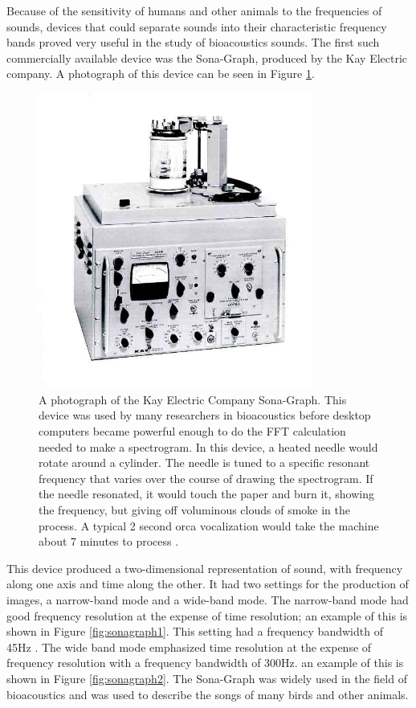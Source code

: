 Because of the sensitivity of humans and other animals to the
frequencies of sounds, devices that could separate sounds into their
characteristic frequency bands proved very useful in the study of
bioacoustics sounds.  The first such commercially available device was
the Sona-Graph, produced by the Kay Electric company.  A photograph of
this device can be seen in Figure \ref{fig:kayElectricSonagram}.

\begin{figure}[t]
\centering
\includegraphics[width=90mm]{figures/kayElectricSonagram}
\caption{A photograph of the Kay Electric Company Sona-Graph.  This
  device was used by many researchers in bioacoustics before desktop
  computers became powerful enough to do the FFT calculation needed to
  make a spectrogram.  In this device, a heated needle would rotate
  around a cylinder.  The needle is tuned to a specific resonant
  frequency that varies over the course of drawing the spectrogram.
  If the needle resonated, it would touch the paper and burn it,
  showing the frequency, but giving off voluminous clouds of smoke in
  the process.  A typical 2 second orca vocalization would take the
  machine about 7 minutes to process \cite{lindblom1962accuracy}. }
\label{fig:kayElectricSonagram}
\end{figure}


This device produced a two-dimensional representation of sound, with
frequency along one axis and time along the other.  It had two
settings for the production of images, a narrow-band mode and a
wide-band mode.  The narrow-band mode had good frequency resolution at
the expense of time resolution; an example of this is shown in Figure
\ref{fig:sonagraph1}.  This setting had a frequency bandwidth of 45Hz
\cite{nowicki1988birds}.  The wide band mode emphasized time
resolution at the expense of frequency resolution with a frequency
bandwidth of 300Hz. an example of this is shown in Figure
\ref{fig:sonagraph2}.  The Sona-Graph was widely used in the field of
bioacoustics and was used to describe the songs of many birds and
other animals.

